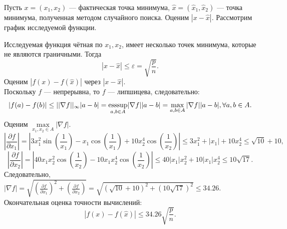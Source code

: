 Пусть $x = (x_1, x_2)$ --- фактическая точка минимума, $\hat{x} = 
 (\hat{x}_1, \hat{x}_2)$ --- точка минимума, полученная методом случайного 
 поиска. Оценим $|x - \hat{x}|$.
Рассмотрим график исследуемой функции.

Исследуемая функция чётная по $x_1, x_2$, имеет несколько точек минимума, 
 которые не являются граничными. Тогда
\begin{equation*}
    |x - \hat{x}| \leq \varepsilon = \sqrt{\frac{p}{n}}.
\end{equation*}
Оценим $|f(x) - f(\hat{x})|$ через $|x - \hat{x}|$.\\
Поскольку $f$ --- непрерывна, то $f$ --- липшицева, следовательно:
\begin{equation*}
|f(a) - f(b)| \leq ||\nabla f||_\infty |a - b| = \underset{a, b\in A}{\operatorname{\text{esssup}}}
 |\nabla f| |a - b| = \max_{a, b \in A}|\nabla f| |a - b|, \forall a, b 
 \in A.
\end{equation*}
Оценим $\max\limits_{x_1, x_2 \in A} |\nabla f|$.\\
\begin{equation*}
\left|\frac{\partial f}{\partial x_1}\right| = \left|3x_1^2\sin(\frac{1}
 {x_1}) - x_1\cos(\frac{1}{x_1})+10x_2^4\cos(\frac{1}{x_2}) \right| \leq 
 3x_1^2+|x_1| +10x_2^4 \leq \sqrt{10} + 10,
\end{equation*}
\begin{equation*}
\left|\frac{\partial f}{\partial x_2}\right| = \left| 40x_1x_2^2 
 \cos(\frac{1}{x_2}) - 10x_1x_2^4 \cos(\frac{1}{x_2})\right| \leq 
 40|x_1|x_2^2 + 10|x_1|x_2^4 \leq 10\sqrt{17}.
\end{equation*}
Следовательно, $|\nabla f| = \sqrt{\left(\frac{\partial f}{\partial x_1} 
 \right)^2 + \left(\frac{\partial f}{\partial x_2}\right)} = 
 \sqrt{(\sqrt{10} + 10)^2+(10\sqrt{17})^2}\leq  34.26.$\\
Окончательная оценка точности вычислений:
\begin{equation*}
|f(x) - f(\hat{x})| \leq 34.26\sqrt{\frac{p}{n}}.
\end{equation*}